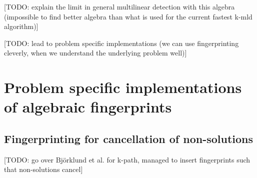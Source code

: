 [TODO: explain the limit in general multilinear detection with this algebra 
(impossible to find better algebra than what is used for the current fastest k-mld algorithm)]

[TODO: lead to problem specific implementations 
(we can use fingerprinting cleverly, when we understand the underlying problem well)]

\section{Problem specific implementations of algebraic fingerprints}

\subsection{Fingerprinting for cancellation of non-solutions}

[TODO: go over Björklund et al. for k-path, managed to insert fingerprints such that non-solutions cancel]

